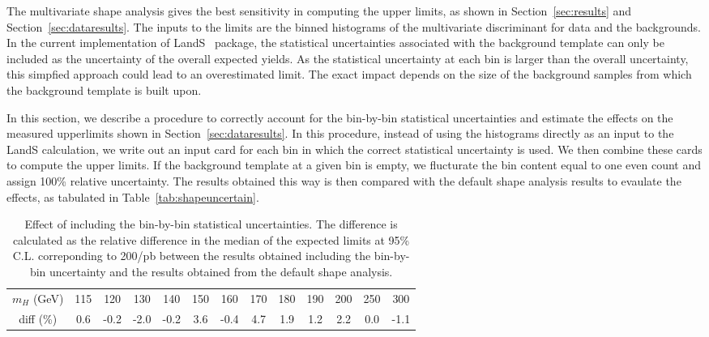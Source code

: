 The multivariate shape analysis gives the best sensitivity in computing the upper limits, 
as shown in Section~\ref{sec:results} and Section~\ref{sec:dataresults}. 
The inputs to the limits are the binned histograms of the multivariate discriminant for 
data and the backgrounds.  
In the current implementation of LandS~\cite{lands} package, 
the statistical uncertainties associated with the background template 
can only be included as the uncertainty of the overall expected yields.  
As the statistical uncertainty at each bin is larger than the overall uncertainty, 
this simpfied approach could lead to an overestimated limit. 
The exact impact depends on the size of the background samples from which 
the background template is built upon. 

In this section, we describe a procedure to correctly account for the bin-by-bin 
statistical uncertainties and estimate the effects on the measured upperlimits shown in 
Section~\ref{sec:dataresults}. In this procedure, instead of using the histograms directly 
as an input to the LandS calculation, we write out an input card for each bin in which 
the correct statistical uncertainty is used. We then combine these cards to compute the 
upper limits. If the background template at a given bin is empty, we flucturate the 
bin content equal to one even count and assign 100\% relative uncertainty. 
The results obtained this way is then compared with the default 
shape analysis results to evaulate the effects, as tabulated in Table~\ref{tab:shapeuncertain}. 

\begin{table}
\begin{center}
\begin{tabular}{c c c c c c c c c c c c c}
\hline
 $m_H$ (GeV) & 115 & 120 & 130 & 140 & 150 & 160 & 170 & 180 & 190 & 200 & 250 & 300 \\
  diff (\%) & 0.6 & -0.2 & -2.0 & -0.2 & 3.6 & -0.4 & 4.7 & 1.9 & 1.2 & 2.2 & 0.0 & -1.1 \\
\hline
\end{tabular}
\end{center}
\caption{Effect of including the bin-by-bin statistical uncertainties. The difference is calculated as the 
relative difference in the median of the expected limits at 95\% C.L. correponding to 200/pb  
between the results obtained including the bin-by-bin uncertainty and the results obtained 
from the default shape analysis. }
\label{tab:shapeuncert}
\end{table}




 

